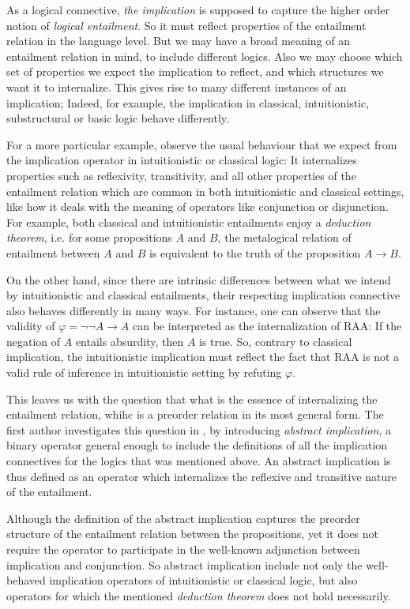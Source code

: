 As a logical connective, \emph{the implication} is supposed to capture the higher order notion of \emph{logical entailment}. So it must reflect properties of the entailment relation in the language level. But we may have a broad meaning of an entailment relation in mind, to include different logics. Also we may choose which set of properties we expect the implication to reflect, and which structures we want it to internalize. This gives rise to many different instances of an implication; Indeed, for example, the implication in classical, intuitionistic, substructural or basic logic behave differently.

For a more particular example, observe the usual behaviour that we expect from the implication operator in intuitionistic or classical logic: It internalizes properties such as reflexivity, transitivity, and all other properties of the entailment relation which are common in both intuitionistic and classical settings, like how it deals with the meaning of operators like conjunction or disjunction. For example, both classical and intuitionistic entailments enjoy a \emph{deduction theorem}, i.e. for some propositions $A$ and $B$, the metalogical relation of entailment between $A$ and $B$ is equivalent to the truth of the proposition $A \rightarrow B$.

On the other hand, since there are intrinsic differences between what we intend by intuitionistic and classical entailments, their respecting implication connective also behaves differently in many ways. For instance, one can observe that the validity of $\varphi = \neg \neg A \rightarrow A$ can be interpreted as the internalization of RAA: If the negation of $A$ entails absurdity, then $A$ is true. So, contrary to classical implication, the intuitionistic implication must reflect the fact that RAA is not a valid rule of inference in intuitionistic setting by refuting $\varphi$.

This leaves us with the question that what is the essence of internalizing the entailment relation, whihc is a preorder relation in its most general form. The first author investigates this question in \cite{amir}, by introducing \emph{abstract implication}, a binary operator general enough to include the definitions of all the implication connectives for the logics that was mentioned above. An abstract implication is thus defined as an operator which internalizes the reflexive and transitive nature of the entailment.

Although the definition of the abstract implication captures the preorder structure of the entailment relation between the propositions, yet it does not require the operator to participate in the well-known adjunction between implication and conjunction. So abstract implication include not only the well-behaved implication operators of intuitionistic or classical logic, but also operators for which the mentioned \emph{deduction theorem} does not hold necessarily.

